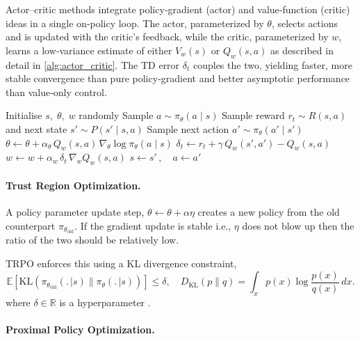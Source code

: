 \bigskip

Actor–critic methods integrate policy‑gradient (actor) and value‑function (critic) ideas in a single on‑policy loop. The actor, parameterized by $\theta$, selects actions and is updated with the critic’s feedback, while the critic, parameterized by $w$, learns a low‑variance estimate of either $V_w(s)$ or $Q_w(s,a)$ as described in detail in \cref{alg:actor_critic}. The \ac{TD} error $\delta_t$ couples the two, yielding faster, more stable convergence than pure policy‑gradient and better asymptotic performance than value‑only control.

\begin{algorithm}
\caption{On‑Policy Actor–Critic (Q‑form)}
\label{alg:actor_critic}
\begin{algorithmic}[1]
  \State Initialise $s,\;\theta,\;w$ randomly
  \State Sample $a \sim \pi_{\theta}(a\mid s)$
      \State Sample reward $r_t \sim R(s,a)$ and next state $s' \sim P(s'\mid s,a)$
      \State Sample next action $a' \sim \pi_{\theta}(a'\mid s')$ 
      \State $\displaystyle\theta \leftarrow \theta + \alpha_{\theta}\,Q_w(s,a)\,\nabla_{\theta}\log\pi_{\theta}(a\mid s)$
      \State $\displaystyle\delta_t \gets r_t + \gamma\,Q_w(s',a') - Q_w(s,a)$
      \State $\displaystyle w \leftarrow w + \alpha_{w}\,\delta_t\,\nabla_{w} Q_w(s,a)$
      \State $s \leftarrow s'\,,\quad a \leftarrow a'$
  \EndFor
\end{algorithmic}
\end{algorithm}

\paragraph{Trust Region Optimization.}

A policy parameter update step, $\theta \leftarrow \theta + \alpha \eta$ creates a new policy from the old counterpart $\pi_{\theta_{\text{old}}}$. If the gradient update is stable i.e., $\eta$  does not blow up then the ratio of the two should be relatively low.

\ac{TRPO} enforces this using a \ac{KL} divergence constraint,
$$
\mathbb E [{\text{KL}}(\pi_{\theta_{\text{old}}}(.\,| s) \| \pi_{\theta}(.\,| s))] \le \delta, \quad D_{\text{KL}}(p \|q) = \int _x p(x) \log \dfrac{p(x)}{q(x)} \, dx.
$$
where $\delta \in \mathbb R$ is a hyperparameter \cite{TRPO2017}.

\paragraph{Proximal Policy Optimization.}

